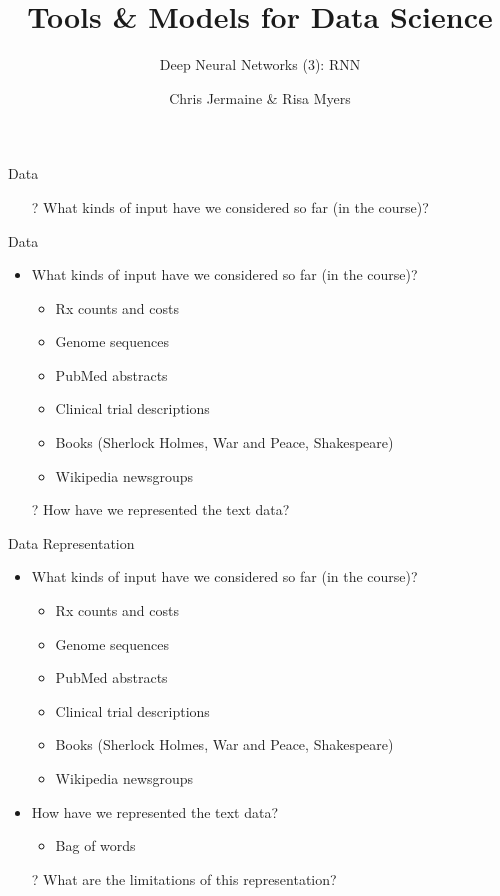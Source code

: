 \documentclass[aspectratio=169]{beamer}
\title[]
{Tools \& Models for Data Science}
\subtitle{Deep Neural Networks (3): RNN}
\author[]{Chris Jermaine \& Risa Myers}
\institute
{
  Rice University 
}
\date[]{}
\begin{document}
\begin{frame}
 \titlepage
\end{frame}
\begin{frame}{Data}

\begin{itemize}
	\item[?] What kinds of input have we considered so far (in the course)?
\end{itemize}
\end{frame}
\begin{frame}{Data}

\begin{itemize}
	\item What kinds of input have we considered so far (in the course)?
	\begin{itemize}
	\item Rx counts and costs
	\item Genome sequences
	\item PubMed abstracts
	\item Clinical trial descriptions
	\item Books (Sherlock Holmes, War and Peace, Shakespeare)
	\item Wikipedia newsgroups
	\end{itemize}
	\item[?] How have we represented the text data?
\end{itemize}
\end{frame}
\begin{frame}{Data Representation}

\begin{itemize}
	\item What kinds of input have we considered so far (in the course)?
	\begin{itemize}
	\item Rx counts and costs
	\item Genome sequences
	\item PubMed abstracts
	\item Clinical trial descriptions
	\item Books (Sherlock Holmes, War and Peace, Shakespeare)
	\item Wikipedia newsgroups
	\end{itemize}
	\item How have we represented the text data?
	\begin{itemize}
		\item Bag of words
	\end{itemize}
	\item[?] What are the limitations of this representation?
\end{itemize}
\end{frame}
\end{document}
